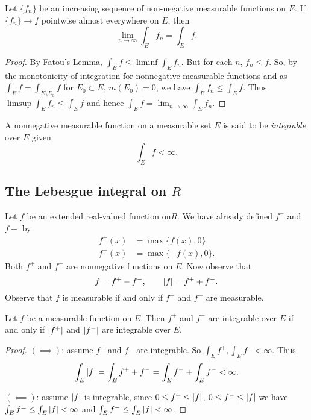 
\begin{theorem}
	Let $\{f_n\}$ be an increasing sequence of non-negative
	measurable functions on $E$.
	If $\{f_n\} \to f$ pointwise almost everywhere on $E$, then
	\[
		\lim_{n \to \infty} \int_E f_n = \int_E f.
	\]
\end{theorem}

\begin{proof}
	By Fatou's Lemma,
	$\int_E f \leq \liminf \int_E f_n$.
	But for each $n$, $f_n \leq f$.
	So, by the monotonicity of integration for nonnegative measurable
	functions and as $\int_E f = \int_{E \setminus E_0} f$
	for $E_0 \subset E$, $m(E_0) = 0$, we have
	$\int_E f_n \leq \int_E f$.
	Thus $\limsup\int_E f_n \leq \int_E f$ and hence
	$\int_E f = \lim_{n \to \infty} \int_E f_n$.
\end{proof}

\begin{definition}
	A nonnegative measurable function on a measurable set $E$ is said to be
	\emph{integrable} over $E$ given
	\[
		\int_E f < \infty.
	\]
\end{definition}

\subsection{The Lebesgue integral on $R$}

Let $f$ be an extended real-valued function on$R$.
We have already defined $f^=$ and $f-$ by
\begin{align*}
	f^+(x) &= \max\{f(x), 0\} \\
	f^-(x) &= \max\{-f(x), 0\}.
\end{align*}
Both $f^+$ and $f^-$ are nonnegative functions on $E$.
Now observe that
\[
	f = f^+ - f^-, \qquad \left\lvert f \right\rvert = f^+ + f^-.
\]
Observe that $f$ is measurable if and only if $f^+$ and $f^-$
are measurable.

\begin{proposition}
	Let $f$ be a measurable function on $E$.
	Then $f^+$ and $f^-$ are integrable over $E$ if and only if 
	$\left\lvert f^+ \right\rvert$ and $\left\lvert f^- \right\rvert$ are integrable over $E$.
\end{proposition}

\begin{proof}
	$(\implies)$: assume $f^+$ and $f^-$ are integrable.
	So $\int_E f^+, \int_E f^- < \infty$.
	Thus
	\[\int_E \left\lvert f \right\rvert = \int_E f^+ + f^- = \int_E f^+ + \int_E f^- < \infty.\]

	$(\impliedby)$: assume $\left\lvert f \right\rvert$ is integrable, since
	$0 \leq f^+ \leq \left\lvert f \right\rvert$, $0 \leq f^- \leq \left\lvert f \right\rvert$ we have
	$\int_E f^= \leq \int_E \left\lvert f \right\rvert < \infty$
	and
	$\int_E f^- \leq \int_E \left\lvert f \right\rvert < \infty$.
\end{proof}


